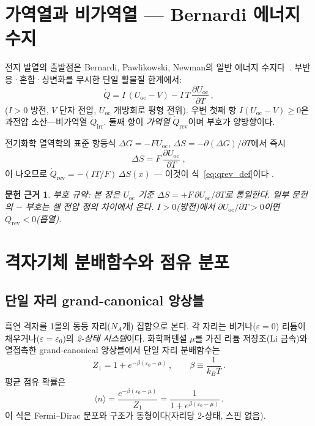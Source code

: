 \documentclass[11pt,a4paper]{article}
\newtheorem*{srcbox}{문헌 근거}
\newcommand{\rev}{\mathrm{rev}}
\newcommand{\irr}{\mathrm{irr}}
\newcommand{\oc}{\mathrm{oc}}
\begin{document}
\section{가역열과 비가역열 --- Bernardi 에너지 수지}\label{sec:bernardi}

전지 발열의 출발점은 Bernardi, Pawlikowski, Newman의 일반 에너지 수지다~\cite{bernardi1985}.
부반응·혼합·상변화를 무시한 단일 활물질 한계에서:
\begin{equation}
  \dot{Q}=I\,(U_{\oc}-V)-I\,T\,\frac{\partial U_{\oc}}{\partial T}\,,
  \label{eq:bernardi}
\end{equation}
($I>0$ 방전, $V$ 단자 전압, $U_{\oc}$ 개방회로 평형 전위).
우변 첫째 항 $I(U_{\oc}-V)\ge0$은 과전압 소산---비가역열 $\dot{Q}_{\irr}$.
둘째 항이 \emph{가역열} $\dot{Q}_{\rev}$이며 부호가 양방향이다.

전기화학 열역학의 표준 항등식
$\Delta G=-FU_{\oc}$, $\Delta S=-\partial(\Delta G)/\partial T$에서 즉시
\begin{equation}
  \Delta S=F\,\frac{\partial U_{\oc}}{\partial T}\;,
  \label{eq:thermo_id}
\end{equation}
이 나오므로 $\dot{Q}_{\rev}=-(IT/F)\,\Delta S(x)$ --- 이것이 식~\eqref{eq:qrev_def}이다
\cite{newman,msmr_partI}.

\begin{srcbox}
부호 규약: 본 장은 $U_{\oc}$ 기준 $\Delta S=+F\,\partial U_{\oc}/\partial T$로 통일한다.
일부 문헌의 $-$ 부호는 셀 전압 정의 차이에서 온다.
$I>0$(방전)에서 $\partial U_{\oc}/\partial T>0$이면 $\dot{Q}_{\rev}<0$(흡열).
\end{srcbox}

\section{격자기체 분배함수와 점유 분포}\label{sec:partition}

\subsection{단일 자리 grand-canonical 앙상블}\label{ssec:single}

흑연 격자를 1몰의 동등 자리($N_A$개) 집합으로 본다.
각 자리는 비거나($\varepsilon=0$) 리튬이 채우거나($\varepsilon=\varepsilon_0$)의
\emph{2-상태 시스템}이다. 화학퍼텐셜 $\mu$를 가진 리튬 저장조(Li 금속)와 열접촉한
grand-canonical 앙상블에서 단일 자리 분배함수는
\begin{equation}
  Z_1 = 1 + e^{-\beta(\varepsilon_0-\mu)}\,,\qquad \beta\equiv\frac{1}{k_BT}\,.
  \label{eq:Z1}
\end{equation}
평균 점유 확률은
\begin{equation}
  \langle n\rangle = \frac{e^{-\beta(\varepsilon_0-\mu)}}{Z_1}
    = \frac{1}{1+e^{\beta(\varepsilon_0-\mu)}}\,.
  \label{eq:FD_form}
\end{equation}
이 식은 Fermi--Dirac 분포와 구조가 동형이다(자리당 2-상태, 스핀 없음).
\end{document}
